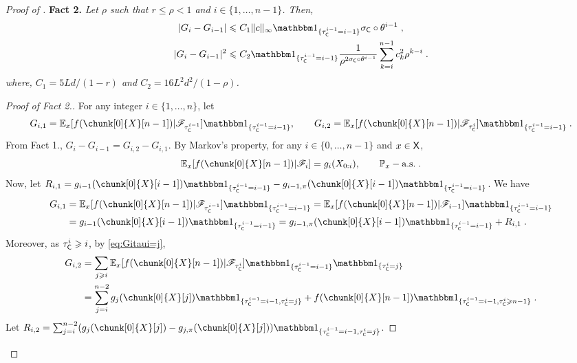 \documentclass[leqno,11pt,a4paper]{article}
\begin{document}
\begin{proof}[Proof of ]
\noindent
{\bf Fact 2.} \emph{Let $\rho$ such that $r\leqslant \rho<1$ and $i\in\{1,\ldots,n-1\}$.
Then,}
\begin{align}
\label{eq:Gi-Gi-1} |G_i-G_{i-1}|&\leqslant C_1\|c\|_{\infty}\indiacc{\tau_{\cC}^{i-1}=i-1}\sigma_{\cC}\circ\theta^{i-1}\eqsp,\\
\label{eq:Gi-Gi-1Sq}  |G_i-G_{i-1}|^2&\leqslant C_2\indiacc{\tau_{\cC}^{i-1}=i-1}\frac1{\rho^{2\sigma_{\cC}\circ\theta^{i-1}}}\sum_{k=i}^{n-1}c_k^2\rho^{k-i}\eqsp.
\end{align}
\emph{where, $C_1=5Ld/(1-r)$ and $C_2=16L^2d^2/(1-\rho)$.}
\begin{proof}[Proof of Fact 2.]
For any integer $i\in\{1,\ldots,n\}$, let
\[
G_{i,1}=\Ebb_x[f(\chunk[0]{X}[n-1])|\cF_{\tau_{\cC}^{i-1}}]\indiacc{\tau_{\cC}^{i-1}=i-1},\qquad G_{i,2}=\Ebb_x[f(\chunk[0]{X}[n-1])|\cF_{\tau_{\cC}^{i}}]\indiacc{\tau_{\cC}^{i-1}=i-1}\eqsp.
\]
From Fact 1., $G_i-G_{i-1}=G_{i,2}-G_{i,1}$.
By Markov's property, for any $i\in \{0,\ldots,n-1\}$ and  $x\in \mathsf{X}$,
\[
\Ebb_x[f(\chunk[0]{X}[n-1])|\cF_i]=g_i(X_{0:i}),\qquad \Pbb_{x}-\text{a.s.}\eqsp.
\]
Now, let $R_{i,1}=g_{i-1}(\chunk[0]{X}[i-1])\indiacc{\tau_{\cC}^{i-1}=i-1}-g_{i-1,\pi}(\chunk[0]{X}[i-1])\indiacc{\tau_{\cC}^{i-1}=i-1}$.
We have
\begin{align}
\notag G_{i,1}&=\Ebb_x[f(\chunk[0]{X}[n-1])|\cF_{\tau_{\cC}^{i-1}}]\indiacc{\tau_{\cC}^{i-1}=i-1}=\Ebb_x[f(\chunk[0]{X}[n-1])|\cF_{i-1}]\indiacc{\tau_{\cC}^{i-1}=i-1}\\
\label{eq:Gi1} &=g_{i-1}(\chunk[0]{X}[i-1])\indiacc{\tau_{\cC}^{i-1}=i-1}=g_{i-1,\pi}(\chunk[0]{X}[i-1])\indiacc{\tau_{\cC}^{i-1}=i-1}+R_{i,1}\eqsp.
\end{align}
Moreover, as $\tau_{\mathsf{C}}^i\geqslant i$, by \eqref{eq:Gitaui=j},
\begin{align}
\notag G_{i,2}&=\sum_{j\geqslant i}\Ebb_x[f(\chunk[0]{X}[n-1])|\cF_{\tau_{\cC}^{i}}]\indiacc{\tau_{\cC}^{i-1}=i-1}\indiacc{\tau_{\cC}^i=j}\\
\label{eq:Gi2} &=\sum_{j=i}^{n-2}g_j(\chunk[0]{X}[j])\indiacc{\tau_{\cC}^{i-1}=i-1,\tau_{\cC}^i=j}+f(\chunk[0]{X}[n-1])\indiacc{\tau_{\cC}^{i-1}=i-1,\tau_{\cC}^i\geqslant n-1}\eqsp.
\end{align}
Let $R_{i,2}=\sum_{j=i}^{n-2}(g_j(\chunk[0]{X}[j])-g_{j,\pi}(\chunk[0]{X}[j]))\indiacc{\tau_{\cC}^{i-1}=i-1,\tau_{\cC}^i=j}$.

\end{proof}
\end{proof}
\end{document}
